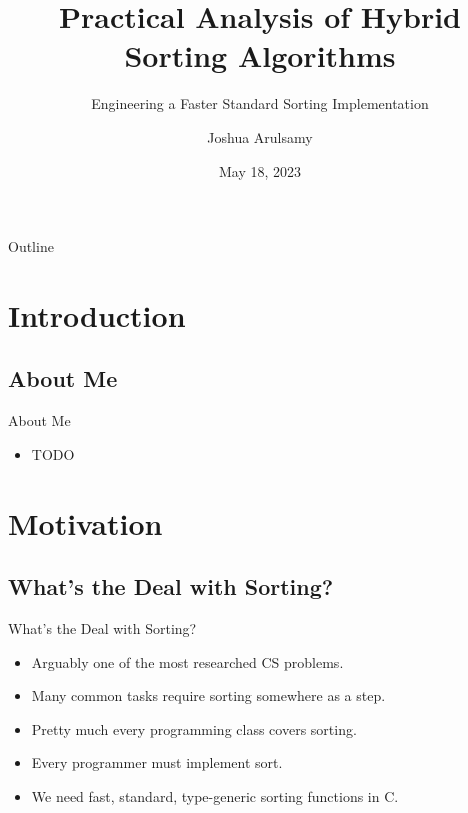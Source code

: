 \documentclass[13pt]{beamer}
\title{Practical Analysis of Hybrid Sorting Algorithms}
\subtitle{Engineering a Faster Standard Sorting Implementation}
\author{Joshua Arulsamy}
\date{May 18, 2023}
\begin{document}
\logo{}
\nocite{*}

\begin{frame}
	\titlepage
\end{frame}

\section{}
\subsection{}
\begin{frame}{Outline}
	\tableofcontents
\end{frame}

\section{Introduction}
\subsection{About Me}
\begin{frame}{About Me}
	\begin{itemize}
		\item TODO
	\end{itemize}
\end{frame}

\section{Motivation}
\subsection{What's the Deal with Sorting?}
\begin{frame}{What's the Deal with Sorting?}
	\pause
	\begin{itemize}[<+->]
		\item Arguably one of the most researched CS problems.
		\item Many common tasks require sorting somewhere as a step.
		\item Pretty much every programming class covers sorting.
		\item Every programmer must implement sort.
		\item We need fast, standard, type-generic sorting functions in C.
	\end{itemize}
\end{frame}
\end{document}
